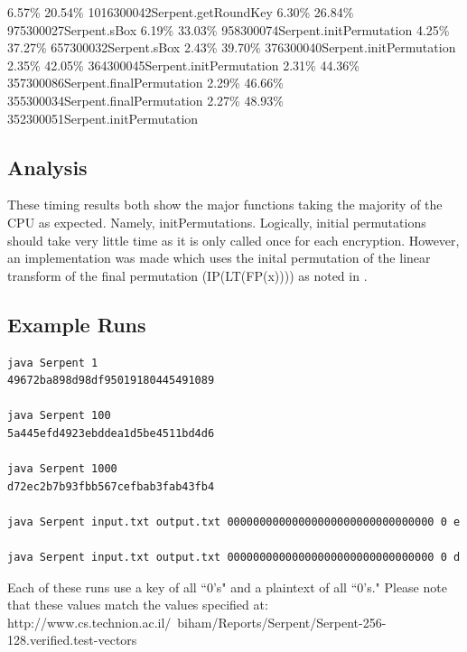 \documentclass[12pt]{article} %
\newcommand{\tab}{\hspace*{2em}}
\begin{document}
\tab  6.57\tab\% 20.54\tab\%    1016\tab 300042\tab Serpent.getRoundKey
\tab  6.30\tab\% 26.84\tab\%     975\tab 300027\tab Serpent.sBox
\tab  6.19\tab\% 33.03\tab\%     958\tab 300074\tab Serpent.initPermutation
\tab  4.25\tab\% 37.27\tab\%     657\tab 300032\tab Serpent.sBox
\tab  2.43\tab\% 39.70\tab\%     376\tab 300040\tab Serpent.initPermutation
\tab  2.35\tab\% 42.05\tab\%     364\tab 300045\tab Serpent.initPermutation
\tab  2.31\tab\% 44.36\tab\%     357\tab 300086\tab Serpent.finalPermutation
\tab  2.29\tab\% 46.66\tab\%     355\tab 300034\tab Serpent.finalPermutation
\tab  2.27\tab\% 48.93\tab\%     352\tab 300051\tab Serpent.initPermutation
\subsection{Analysis}
These timing results both show the major functions taking the majority of the CPU as expected. Namely, initPermutations. Logically, initial permutations should take very little time as it is only called once for each encryption. However, an implementation was made which uses the inital permutation of the linear transform of the final permutation (IP(LT(FP(x)))) as noted in \cite{SERPENT}.

\subsection{Example Runs}
\begin{lstlisting}
java Serpent 1
49672ba898d98df95019180445491089

java Serpent 100
5a445efd4923ebddea1d5be4511bd4d6

java Serpent 1000
d72ec2b7b93fbb567cefbab3fab43fb4

java Serpent input.txt output.txt 00000000000000000000000000000000 0 e

java Serpent input.txt output.txt 00000000000000000000000000000000 0 d

\end{lstlisting}
Each of these runs use a key of all ``0's" and a plaintext of all ``0's." Please note that these values match the values specified at: http://www.cs.technion.ac.il/~biham/Reports/Serpent/Serpent-256-128.verified.test-vectors
\end{document}
